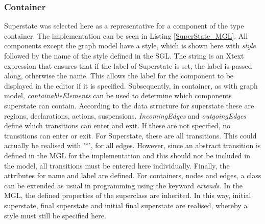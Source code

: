 \subsubsection{Container}
Superstate was selected here as a representative for a component of the type container. The implementation can be seen in Listing \ref{SuperState_MGL}. All components except the graph model have a style, which is shown here with \textit{style} followed by the name of the style defined in the SGL. The string is an Xtext expression that ensures that if the label of Superstate is set, the label is passed along, otherwise the name. This allows the label for the component to be displayed in the editor if it is specified. Subsequently, in container, as with graph model, \textit{containableElements} can be used to determine which components superstate can contain. According to the data structure for superstate these are regions, declarations, actions, suspensions. \textit{IncomingEdges} and \textit{outgoingEdges} define which transitions can enter and exit. If these are not specified, no transitions can enter or exit. For Superstate, these are all transitions. This could actually be realised with '*', for all edges. However, since an abstract transition is defined in the MGL for the implementation and this should not be included in the model, all transitions must be entered here individually. Finally, the attributes for name and label are defined. For containers, nodes and edges, a class can be extended as usual in programming using the keyword \textit{extends}. In the MGL, the defined properties of the superclass are inherited. In this way, initial superstate, final superstate and initial final superstate are realised, whereby a style must still be specified here.


